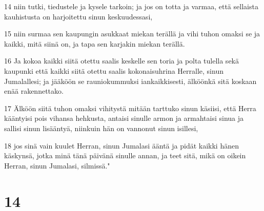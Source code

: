 \par 14 niin tutki, tiedustele ja kysele tarkoin; ja jos on totta ja varmaa, että sellaista kauhistusta on harjoitettu sinun keskuudessasi,
\par 15 niin surmaa sen kaupungin asukkaat miekan terällä ja vihi tuhon omaksi se ja kaikki, mitä siinä on, ja tapa sen karjakin miekan terällä.
\par 16 Ja kokoa kaikki siitä otettu saalis keskelle sen toria ja polta tulella sekä kaupunki että kaikki siitä otettu saalis kokonaisuhrina Herralle, sinun Jumalallesi; ja jääköön se rauniokummuksi iankaikkisesti, älköönkä sitä koskaan enää rakennettako.
\par 17 Älköön siitä tuhon omaksi vihitystä mitään tarttuko sinun käsiisi, että Herra kääntyisi pois vihansa hehkusta, antaisi sinulle armon ja armahtaisi sinua ja sallisi sinun lisääntyä, niinkuin hän on vannonut sinun isillesi,
\par 18 jos sinä vain kuulet Herran, sinun Jumalasi ääntä ja pidät kaikki hänen käskynsä, jotka minä tänä päivänä sinulle annan, ja teet sitä, mikä on oikein Herran, sinun Jumalasi, silmissä."

\chapter{14}

